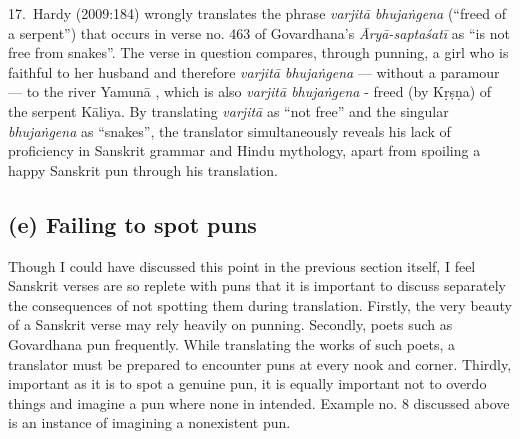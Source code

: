 17.~Hardy (2009:184) wrongly translates the phrase \textsl{varjitā bhujaṅgena} (“freed of a serpent”) that occurs in verse no. 463 of Govardhana’s \textsl{Āryā-saptaśatī} as “is not free from snakes”. The verse in question compares, through punning, a girl who is faithful to her husband and therefore \textsl{varjitā bhujaṅgena} --- without a paramour --- to the river Yamunā , which is also \textsl{varjitā bhujaṅgena } -  freed (by Kṛṣṇa) of the serpent Kāliya. By translating \textsl{varjitā} as “not free” and the singular \textsl{bhujaṅgena} as “snakes”, the translator simultaneously reveals his lack of proficiency in Sanskrit grammar and Hindu mythology, apart from spoiling a happy Sanskrit pun through his translation. 

\subsection*{(e) Failing to spot puns}

Though I could have discussed this point in the previous section itself, I feel Sanskrit verses are so replete with puns that it is important to discuss separately the consequences of not spotting them during translation. Firstly, the very beauty of a Sanskrit verse may rely heavily on punning. Secondly, poets such as Govardhana pun frequently. While translating the works of such poets, a translator must be prepared to encounter puns at every nook and corner. Thirdly, important as it is to spot a genuine pun, it is equally important not to overdo things and imagine a pun where none in intended. Example no. 8 discussed above is an instance of imagining a nonexistent pun. 

